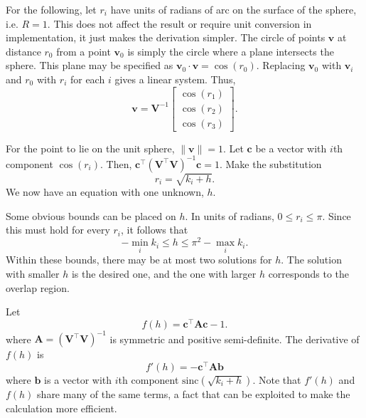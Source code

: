 \documentclass[]{interact}
\begin{document}
For the following, let $r_i$ have units of radians of arc on the surface of the
sphere, i.e. $R=1$. This does not affect the result or require unit conversion
in implementation, it just makes the derivation simpler. The circle of points
$\mathbf v$ at distance $r_0$ from a point $\mathbf v_0$ is simply the circle
where a plane intersects the sphere. This plane may be specified as
$\mathbf v_0 \cdot \mathbf v = \cos\left(r_0\right).$
Replacing $\mathbf v_0$ with $\mathbf v_i$ and $r_0$ with $r_i$ for each $i$
gives a linear system. Thus,
\begin{equation}\label{eq:inversev}
  \mathbf v = \mathbf V^{-1} \begin{bmatrix*} \cos\left(r_1\right) \\
  \cos\left(r_2\right) \\
  \cos\left(r_3\right)
  \end{bmatrix*}.
\end{equation}

For the point to lie on the unit sphere, $\|\mathbf v\| = 1$. Let $\mathbf c$
be a vector with $i$th component $\cos\left(r_i \right)$. Then,
$\mathbf c^\top \left(\mathbf V^\top \mathbf V\right )^{-1} \mathbf c = 1$.
Make the substitution
\begin{equation}\label{eq:inverser}
  r_i = \sqrt{k_i + h}.
\end{equation} We now have an equation with one unknown, $h$.

Some obvious bounds can be placed on $h$. In units of radians,
$0 \le r_i \le \pi$. Since this must hold for every $r_i$, it follows that
\begin{equation}
   -\min_i k_i \le h \le \pi^2 - \max_i k_i.
\end{equation}
Within these bounds, there may be at most two solutions for $h$. The solution
with smaller $h$ is the desired one, and the one with larger $h$ corresponds to
the overlap region.

Let
\begin{equation}\label{eq:inversefh}
f(h) = \mathbf c^\top \mathbf A \mathbf c - 1.
\end{equation}
where $\mathbf A = \left(\mathbf V^\top \mathbf V\right )^{-1}$
 is symmetric and positive semi-definite.
The derivative of $f(h)$ is
\begin{equation}\label{eq:inversefph}
  f'(h) = -\mathbf c^\top \mathbf A \mathbf b
\end{equation}
where $\mathbf b$ is a vector with $i$th component
$\mathrm{sinc}\left(\sqrt{k_i + h}\right)$.
Note that $f'(h)$ and $f(h)$ share many of the same terms, a fact that can be
exploited to make the calculation more efficient.
\end{document}
